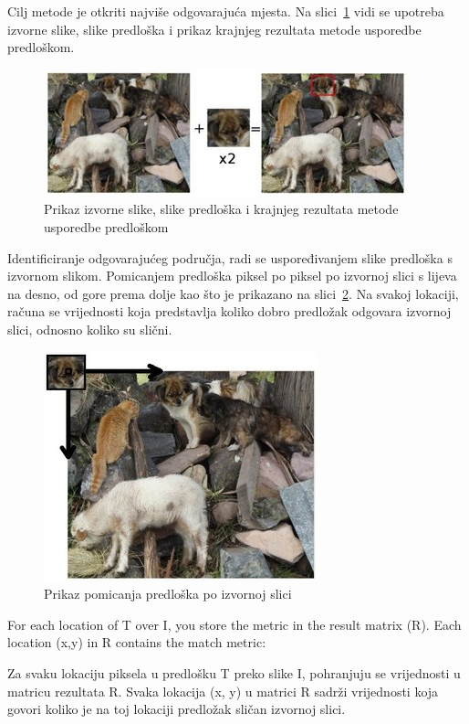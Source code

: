 Cilj metode je otkriti najviše odgovarajuća mjesta. Na
slici~\ref{fig:tm1.jpg} vidi se upotreba izvorne slike, slike predloška
i prikaz krajnjeg rezultata metode usporedbe predloškom.

\begin{figure}[h]
\centering
\includegraphics[scale=1]{figures/tm1.jpg}
\caption{Prikaz izvorne slike, slike predloška i krajnjeg rezultata
metode usporedbe predloškom}
\label{fig:tm1.jpg}
\end{figure}

Identificiranje odgovarajućeg područja, radi se uspoređivanjem slike
predloška s izvornom slikom. Pomicanjem predloška piksel po piksel po
izvornoj slici s lijeva na desno, od gore prema dolje kao što je
prikazano na slici~\ref{fig:tm2.jpg}. Na svakoj lokaciji, računa se
vrijednosti koja predstavlja koliko dobro predložak odgovara izvornoj
slici, odnosno koliko su slični.

\begin{figure}[h]
\centering
\includegraphics[scale=0.5]{figures/tm2.jpg}
\caption{Prikaz pomicanja predloška po izvornoj slici}
\label{fig:tm2.jpg}
\end{figure}

For each location of T over I, you store the metric in the result matrix
(R). Each location (x,y) in R contains the match metric:

Za svaku lokaciju piksela u predlošku T preko slike I, pohranjuju se
vrijednosti u matricu rezultata R. Svaka lokacija (x, y) u matrici R
sadrži vrijednosti koja govori koliko je na toj lokaciji predložak
sličan izvornoj slici. 

